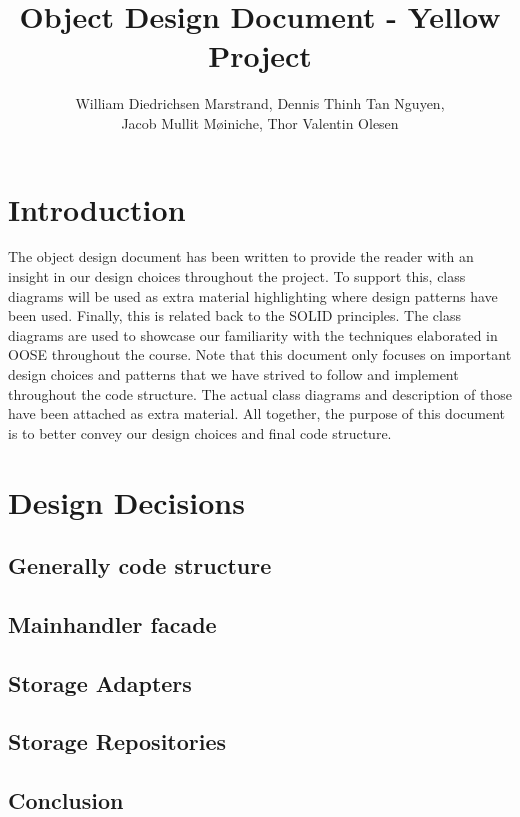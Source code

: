 \documentclass{article}
\title{Object Design Document - Yellow Project}
\author{William Diedrichsen Marstrand, Dennis Thinh Tan Nguyen, 
\\Jacob Mullit M{\o}iniche, Thor Valentin Olesen}
\begin{document}
\maketitle
\newpage
\tableofcontents
\newpage

\section{Introduction}

The object design document has been written to provide the reader with an insight in our design choices throughout the project. To support this, class diagrams will be used as extra material highlighting where design patterns have been used. Finally, this is related back to the SOLID principles. The class diagrams are used to showcase our familiarity with the techniques elaborated in OOSE throughout the course. Note that this document only focuses on important design choices and patterns that we have strived to follow and implement throughout the code structure. The actual class diagrams and description of those have been attached as extra material. All together, the purpose of this document is to better convey our design choices and final code structure. 



\section{Design Decisions}
	\subsection{Generally code structure}
		
	\subsection{Mainhandler facade}
		
	\subsection{Storage Adapters}
		
		\newpage
	\subsection{Storage Repositories}
		
	\subsection{Conclusion}
		
	
\end{document}

